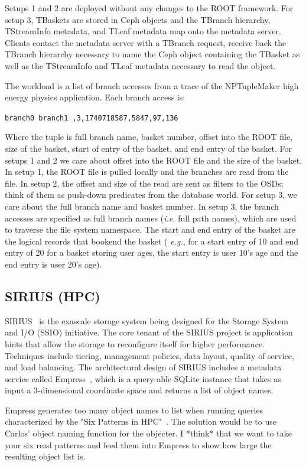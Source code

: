 Setups 1 and 2 are deployed without any changes to the ROOT framework. For
setup 3, TBaskets are stored in Ceph objects and the TBranch hierarchy,
TStreamInfo metadata, and TLeaf metadata map onto the metadata server.
Clients contact the metadata server with a TBranch request, receive back
the TBranch hierarchy necessary to name the Ceph object containing the TBasket
as well as the TStreamInfo and TLeaf metadata necessary to read the object. 

The workload is a list of branch accesses from a trace of the NPTupleMaker high
energy physics application. Each branch access is:

\noindent\texttt{branch0 branch1 ,3,1740718587,5847,97,136}

Where the tuple is full branch name, basket number, offset into the ROOT file,
size of the basket, start of entry of the basket, and end entry of the basket.
For setups 1 and 2 we care about offset into the ROOT file and the size of the
basket.  In setup 1, the ROOT file is pulled locally and the branches are read
from the file. In setup 2, the offset and size of the read are sent as filters
to the OSDs; think of them as push-down predicates from the database world.
For setup 3, we care about the full branch name and basket number.  In setup 3,
the branch accesses are specified as full branch names ({\it i.e.} full path
names), which are used to traverse the file system namespace. The start and end
entry of the basket are the logical records that bookend the basket ({\it
e.g.}, for a start entry of 10 and end entry of 20 for a basket storing user
ages, the start entry is user 10's age and the end entry is user 20's age).  

\subsection{SIRIUS (HPC)}

SIRIUS~\cite{klasky:journal16-sirius} is the exascale storage system being
designed for the Storage System and I/O (SSIO) initiative. The core tenant of
the SIRIUS project is application hints that allow the storage to reconfigure
itself for higher performance. Techniques include tiering, management policies,
data layout, quality of service, and load balancing. The architectural design
of SIRIUS includes a metadata service called
Empress~\cite{lawson:pdsw17-empress}, which is a query-able SQLite instance
that takes as input a 3-dimensional coordinate space and returns a list of
object names.

Empress generates too many object names to list when running queries
characterized by the "Six Patterns in HPC"~\cite{lofstead:hpdc11-6degrees}. The
solution would be to use Carlos' object naming function for the objecter. I
*think* that we want to take your six read patterns and feed them into Empress
to show how large the resulting object list is.
